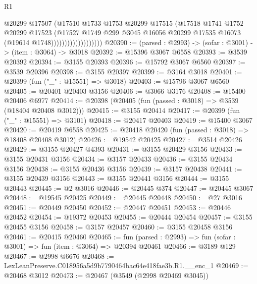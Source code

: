 \begin{lexlean}{R1}
\begin{coremodule}
                                  @20299
                                  @17507
                                  (@17510
                                    @1733
                                    @1753
                                    @20299
                                    @17515
                                    (@17518
                                      @1741
                                      @1752
                                      @20299
                                      @17523
                                      (@17527
                                        @1749
                                        @299
                                        @3045
                                        @16056
                                        @20299
                                        @17535
                                        @16073
                                        (@19614 @1748)))))))))))))))))))
@20390 := (parsed : @2993) -> (sofar : @3001) -> (item : @3064) -> @3018
@20392 := @15396 @3067 @6558
@20393 := @3539 @20392
@20394 := @3155 @20393
@20396 := @15792 @3067 @6560
@20397 := @3539 @20396
@20398 := @3155 @20397
@20399 := @3164 @3018
@20401 := @20399 (fun ("_" : @15551) => @3018)
@20403 := @15796 @3067 @6560
@20405 := @20401 @20403 @3156
@20406 := @3066 @3176
@20408 := @15400 @20406 @6977
@20414 := @20398 (@20405 (fun (passed : @3018) => @3539 (@18404 @20408 @3012)))
@20415 := @3155 @20414
@20417 := @20399 (fun ("_" : @15551) => @3101)
@20418 := @20417 @20403
@20419 := @15400 @3067
@20420 := @20419 @6558
@20425 := @20418 @20420 (fun (passed : @3018) => @18408 @20408 @3012)
@20426 := @19542 @20425
@20427 := @3514 @20426
@20429 := @3155 @20427 @4393
@20431 := @3155 @20429 @3156
@20433 := @3155 @20431 @3156
@20434 := @3157 @20433
@20436 := @3155 @20434 @3156
@20438 := @3155 @20436 @3156
@20439 := @3157 @20438
@20441 := @3155 @20439 @3156
@20443 := @3155 @20441 @3156
@20444 := @3155 @20443
@20445 := @2 @3016
@20446 := @20445 @374
@20447 := @20445 @3067
@20448 := @19545 @20425
@20449 := @20445 @20448
@20450 := @27 @3016
@20451 := @20449 @20450
@20452 := @20447 @20451
@20453 := @20446 @20452
@20454 := @19372 @20453
@20455 := @20444 @20454
@20457 := @3155 @20455 @3156
@20458 := @3157 @20457
@20460 := @3155 @20458 @3156
@20461 := @20415 @20460
@20465 := fun (parsed : @2993) => fun (sofar : @3001) => fun (item : @3064) => @20394 @20461
@20466 := @3189 @129
@20467 := @2998 @6676
@20468 := LexLeanPreserve.C018956a5d9b7790464bac64e418fae3b.R1.__enc_1
@20469 := @20468 @3012
@20473 := @20467 (@3549 (@2998 @20469 @3045))

\end{coremodule}
\end{lexlean}
